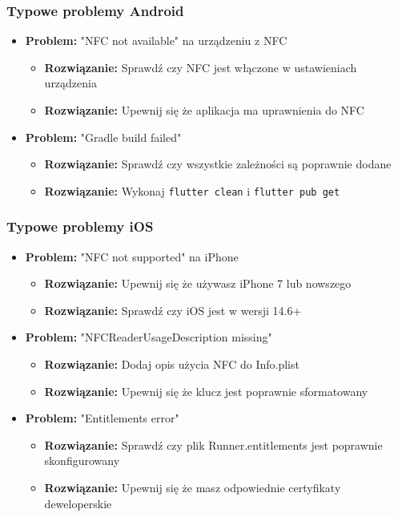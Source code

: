 \documentclass[a4paper,12pt]{article}
\begin{document}
\subsubsection{Typowe problemy Android}
\begin{itemize}
    \item \textbf{Problem:} "NFC not available" na urządzeniu z NFC
    \begin{itemize}
        \item \textbf{Rozwiązanie:} Sprawdź czy NFC jest włączone w ustawieniach urządzenia
        \item \textbf{Rozwiązanie:} Upewnij się że aplikacja ma uprawnienia do NFC
    \end{itemize}
    
    \item \textbf{Problem:} "Gradle build failed"
    \begin{itemize}
        \item \textbf{Rozwiązanie:} Sprawdź czy wszystkie zależności są poprawnie dodane
        \item \textbf{Rozwiązanie:} Wykonaj \texttt{flutter clean} i \texttt{flutter pub get}
    \end{itemize}
\end{itemize}

\subsubsection{Typowe problemy iOS}
\begin{itemize}
    \item \textbf{Problem:} "NFC not supported" na iPhone
    \begin{itemize}
        \item \textbf{Rozwiązanie:} Upewnij się że używasz iPhone 7 lub nowszego
        \item \textbf{Rozwiązanie:} Sprawdź czy iOS jest w wersji 14.6+
    \end{itemize}
    
    \item \textbf{Problem:} "NFCReaderUsageDescription missing"
    \begin{itemize}
        \item \textbf{Rozwiązanie:} Dodaj opis użycia NFC do Info.plist
        \item \textbf{Rozwiązanie:} Upewnij się że klucz jest poprawnie sformatowany
    \end{itemize}
    
    \item \textbf{Problem:} "Entitlements error"
    \begin{itemize}
        \item \textbf{Rozwiązanie:} Sprawdź czy plik Runner.entitlements jest poprawnie skonfigurowany
        \item \textbf{Rozwiązanie:} Upewnij się że masz odpowiednie certyfikaty deweloperskie
    \end{itemize}
\end{itemize}
\end{document}
